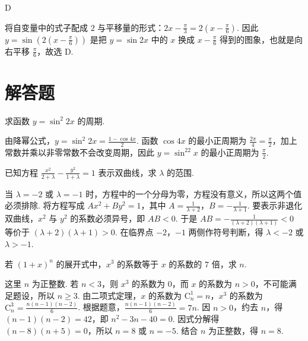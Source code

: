 \begin{answer}
D
\end{answer}

\begin{solution}
将自变量中的式子配成 \(2\) 与平移量的形式：\(2x-\frac\pi3=2\left(x-\frac\pi6\right)\). 因此 \(y=\sin\left(2\left(x-\frac\pi6\right)\right)\) 是把 \(y=\sin2x\) 中的 \(x\) 换成 \(x-\frac\pi6\) 得到的图象，也就是向右平移 \(\frac\pi6\)，故选 D.
\end{solution}

\section{解答题}

\begin{problem}
求函数 \(y = \sin^2 2x\) 的周期.
\end{problem}

\begin{solution}
由降幂公式，\(y=\sin^2 2x=\frac{1-\cos4x}{2}\). 函数 \(\cos4x\) 的最小正周期为 \(\frac{2\pi}{4}=\frac\pi2\)，加上常数并乘以非零常数不会改变周期，因此 \(y=\sin^22x\) 的最小正周期为 \(\frac\pi2\).
\end{solution}

\begin{problem}
已知方程 \(\frac{x^2}{2 + \lambda} - \frac{y^2}{1 + \lambda} = 1\) 表示双曲线，求 \(\lambda\) 的范围.
\end{problem}

\begin{solution}
当 \(\lambda=-2\) 或 \(\lambda=-1\) 时，方程中的一个分母为零，方程没有意义，所以这两个值必须排除. 将方程写成 \(Ax^2+By^2=1\)，其中 \(A=\frac{1}{\lambda+2}\)，\(B=-\frac{1}{\lambda+1}\). 要表示非退化双曲线，\(x^2\) 与 \(y^2\) 的系数必须异号，即 \(AB<0\). 于是 \(AB=-\frac{1}{(\lambda+2)(\lambda+1)}<0\) 等价于 \((\lambda+2)(\lambda+1)>0\). 在临界点 \(-2\)，\(-1\) 两侧作符号判断，得 \(\lambda<-2\) 或 \(\lambda>-1\).
\end{solution}

\begin{problem}
若 \((1 + x)^n\) 的展开式中，\(x^3\) 的系数等于 \(x\) 的系数的 \(7\) 倍，求 \(n\).
\end{problem}

\begin{solution}
这里 \(n\) 为正整数. 若 \(n<3\)，则 \(x^3\) 的系数为 \(0\)，而 \(x\) 的系数为 \(n>0\)，不可能满足题设，所以 \(n\geq3\). 由二项式定理，\(x\) 的系数为 \(\mathrm C_n^1=n\)，\(x^3\) 的系数为 \(\mathrm C_n^3=\frac{n(n-1)(n-2)}6\). 根据题意，\(\frac{n(n-1)(n-2)}6=7n\). 因 \(n>0\)，约去 \(n\)，得 \((n-1)(n-2)=42\)，即 \(n^2-3n-40=0\). 因式分解得 \((n-8)(n+5)=0\)，所以 \(n=8\) 或 \(n=-5\). 结合 \(n\) 为正整数，得 \(n=8\).
\end{solution}


